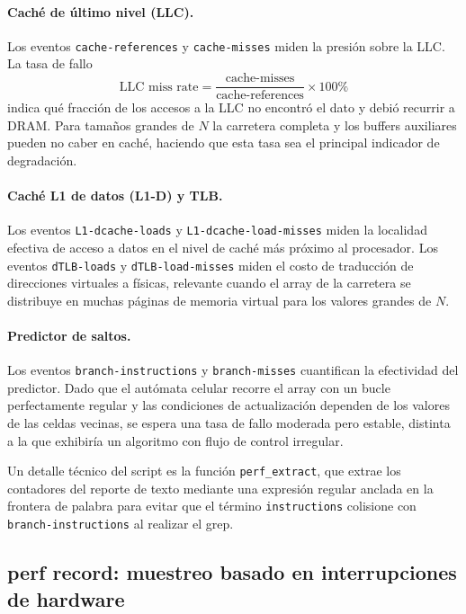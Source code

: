 \paragraph{Caché de último nivel (LLC).}
Los eventos \texttt{cache-references} y \texttt{cache-misses} miden la presión
sobre la LLC.
La tasa de fallo
\begin{equation}
    \text{LLC miss rate} = \frac{\text{cache-misses}}{\text{cache-references}} \times 100\%
\end{equation}
indica qué fracción de los accesos a la LLC no encontró el dato y debió recurrir a
DRAM.
Para tamaños grandes de $N$ la carretera completa y los buffers auxiliares pueden no
caber en caché, haciendo que esta tasa sea el principal indicador de degradación.

\paragraph{Caché L1 de datos (L1-D) y TLB.}
Los eventos \texttt{L1-dcache-loads} y \texttt{L1-dcache-load-misses} miden la
localidad efectiva de acceso a datos en el nivel de caché más próximo al procesador.
Los eventos \texttt{dTLB-loads} y \texttt{dTLB-load-misses} miden el costo de
traducción de direcciones virtuales a físicas, relevante cuando el array de la
carretera se distribuye en muchas páginas de memoria virtual para los valores grandes
de $N$.

\paragraph{Predictor de saltos.}
Los eventos \texttt{branch-instructions} y \texttt{branch-misses} cuantifican la
efectividad del predictor.
Dado que el autómata celular recorre el array con un bucle perfectamente regular y
las condiciones de actualización dependen de los valores de las celdas vecinas, se
espera una tasa de fallo moderada pero estable, distinta a la que exhibiría un
algoritmo con flujo de control irregular.

Un detalle técnico del script es la función \texttt{perf\_extract}, que extrae los
contadores del reporte de texto mediante una expresión regular anclada en la
frontera de palabra para evitar que el término \texttt{instructions} colisione con
\texttt{branch-instructions} al realizar el grep.


\subsection{perf record: muestreo basado en interrupciones de hardware}

